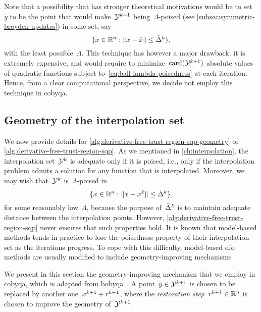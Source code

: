 Note that a possibility that has stronger theoretical motivations would be to set~$\bar{y}$ to be the point that would make~$\xpt[k + 1]$ being~$\Lambda$-poised (see \cref{subsec:symmetric-broyden-updates}) in some set, say
\begin{equation}
    \label{eq:ball-lambda-poisedness}
    \set{x \in \R^n : \norm{x - \bar{\iter}} \le \radlb[k]},
\end{equation}
with the least possible~$\Lambda$.
This technique has however a major drawback: it is extremely expensive, and would require to minimize~$\card(\xpt[k + 1])$ absolute values of quadratic functions subject to~\cref{eq:ball-lambda-poisedness} at each iteration.
Hence, from a clear computational perspective, we decide not employ this technique in \gls{cobyqa}.

\subsection{Geometry of the interpolation set}
\label{subsec:geometry-improvement}

We now provide details for \cref{alg:derivative-free-trust-region-sqp-geometry} of \cref{alg:derivative-free-trust-region-sqp}.
As we mentioned in \cref{ch:interpolation}, the interpolation set~$\xpt[k]$ is adequate only if it is poised, i.e., only if the interpolation problem admits a solution for any function that is interpolated.
Moreover, we may wish that~$\xpt[k]$ is~$\Lambda$-poised in
\begin{equation*}
    \set{\iter \in \R^n : \norm{x - \iter[k]} \le \radlb[k]},
\end{equation*}
for some reasonably low~$\Lambda$, because the purpose of~$\radlb[k]$ is to maintain adequate distance between the interpolation points.
However, \cref{alg:derivative-free-trust-region-sqp} never ensures that such properties hold.
It is known that model-based methods tends in practice to lose the poisedness property of their interpolation set as the iterations progress.
To cope with this difficulty, model-based \gls{dfo} methods are usually modified to include geometry-improving mechanisms~\cite{Conn_Scheinberg_Vicente_2008a,Conn_Scheinberg_Vicente_2008b,Fasano_Morales_Nocedal_2009}.

We present in this section the geometry-improving mechanism that we employ in \gls{cobyqa}, which is adapted from \gls{bobyqa}~\cite{Powell_2009}.
A point~$\bar{y} \in \xpt[k + 1]$ is chosen to be replaced by another one~$\iter[k + 1] + \rstep[k + 1]$, where the \emph{restoration step}~$\rstep[k + 1] \in \R^n$ is chosen to improve the geometry of~$\xpt[k + 1]$.

